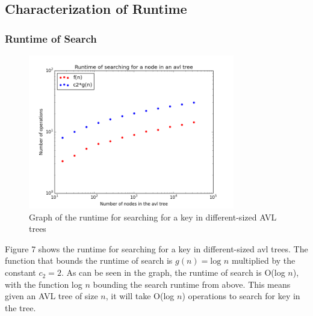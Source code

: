 \documentclass[12pt]{article}
\begin{document}
\subsection*{Characterization of Runtime}

\subsubsection*{Runtime of Search}
\begin{figure}[h]
\caption{Graph of the runtime for searching for a key in different-sized AVL
trees}
\includegraphics[width=9cm]{search_runtime.png}
\centering
\end{figure}
\noindent
Figure 7 shows the runtime for searching for a key in different-sized
avl trees.
The function that bounds the runtime of search is $g(n)= \text{log }n$ multiplied by
the constant $c_2=2$.  As can be seen in the graph, the
runtime of search is O(log $n$), with the function log $n$ bounding the
search runtime from above.  This means given an AVL tree of size $n$, it will
take O(log $n$) operations to search for key in the tree.

\end{document}
